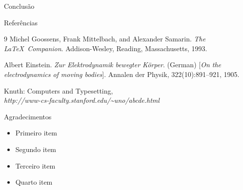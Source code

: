 \documentclass{poster_sefim}
\begin{document}
\begin{frame}{}
\begin{columns}
    \begin{columnbox} %
        \begin{block}{\Large Conclusão}
            \justifying
            \blindtext[3] %
        \end{block}
        \blindtext[1]
        \begin{block}{\Large Referências}
            \begin{thebibliography}{9}
                Michel Goossens, Frank Mittelbach, and Alexander Samarin. 
                \textit{The \LaTeX\ Companion}. 
                Addison-Wesley, Reading, Massachusetts, 1993.
                 
                Albert Einstein. 
                \textit{Zur Elektrodynamik bewegter K{\"o}rper}. (German) 
                [\textit{On the electrodynamics of moving bodies}]. 
                Annalen der Physik, 322(10):891–921, 1905.
                 
                Knuth: Computers and Typesetting,
                \\\textit{http://www-cs-faculty.stanford.edu/\~{}uno/abcde.html}
            \end{thebibliography}
        \end{block}
        
        \begin{block}{\Large Agradecimentos}
            \justifying
            \begin{itemize}
                \item Primeiro item 
                \item Segundo item
                \item Terceiro item
                \item Quarto item 
            \end{itemize}
        \end{block}
        
    \end{columnbox}

    \end{columns} %
    \end{frame}
\end{document}
